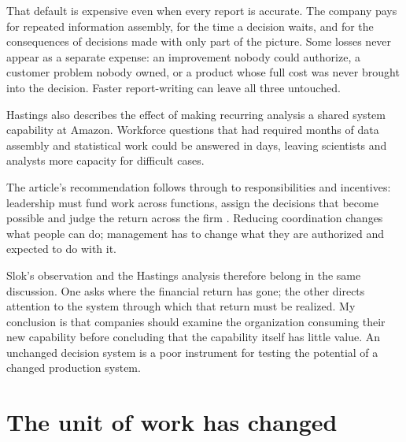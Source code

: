 \SurveyFigure

\clearpage

\begin{EssayColumns}

That default is expensive even when every report is accurate. The
company pays for repeated information assembly, for the time a decision
waits, and for the consequences of decisions made with only part of the
picture. Some losses never appear as a separate expense: an improvement
nobody could authorize, a customer problem nobody owned, or a product
whose full cost was never brought into the decision. Faster
report-writing can leave all three untouched.

Hastings also describes the effect of making recurring analysis a shared
system capability at Amazon. Workforce questions that had required
months of data assembly and statistical work could be answered in days,
leaving scientists and analysts more capacity for difficult cases.

\NextEssayColumn

The article's recommendation follows through to responsibilities and
incentives: leadership must fund work across functions, assign the
decisions that become possible and judge the return across the firm
\citep{hastings2026deployment}. Reducing coordination changes what
people can do; management has to change what they are authorized and
expected to do with it.

Slok's observation and the Hastings analysis therefore belong in the
same discussion. One asks where the financial return has gone; the other
directs attention to the system through which that return must be
realized. My conclusion is that companies should examine the
organization consuming their new capability before concluding that the
capability itself has little value. An unchanged decision system is a
poor instrument for testing the potential of a changed production
system.

\end{EssayColumns}

\PortfolioFigure

\clearpage

\section{The unit of work has
changed}\label{the-unit-of-work-has-changed}

